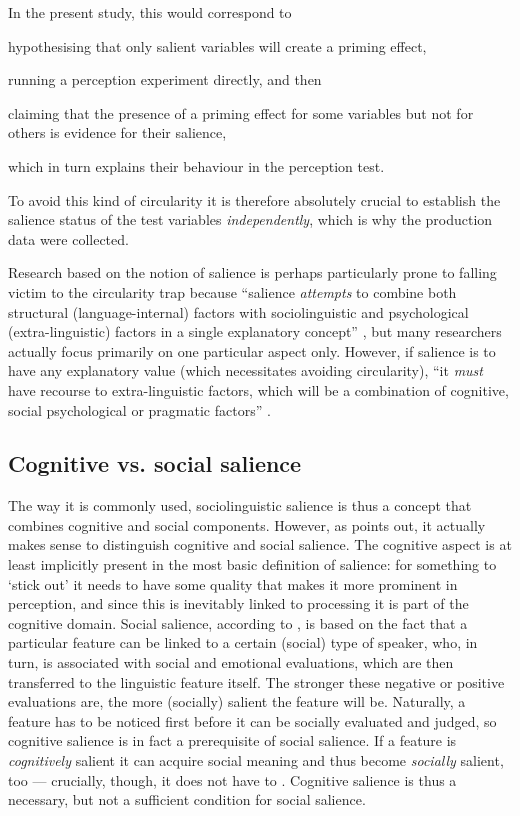 In the present study, this would correspond to
\begin{inparaenum}[(1)]
	\item hypothesising that only salient variables will create a priming effect,
	\item running a perception experiment directly, and then
	\item claiming that the presence of a priming effect for some variables but not for others is evidence for their salience,
	\item which in turn explains their behaviour in the perception test.
\end{inparaenum}
To avoid this kind of circularity it is therefore absolutely crucial to establish the salience status of the test variables \emph{independently}, which is why the production data were collected.

Research based on the notion of salience is perhaps particularly prone to falling victim to the circularity trap because ``salience \emph{attempts} to combine both structural (language-internal) factors with sociolinguistic and psychological (extra-linguistic) factors in a single explanatory concept'' \parencite[83, my emphasis]{kerswillwilliams2002}, but many researchers actually focus primarily on one particular aspect only.
However, if salience is to have any explanatory value (which necessitates avoiding circularity), ``it \emph{must} have recourse to extra-linguistic factors, which will be a combination of cognitive, social psychological or pragmatic factors'' \parencite[83, my emphasis]{kerswillwilliams2002}.

		\subsection{Cognitive vs. social salience}
		\label{sec.sal.sal.cog}

The way it is commonly used, sociolinguistic salience is thus a concept that combines cognitive and social components.
However, as \textcite[cf.][11]{racz2013} points out, it actually makes sense to distinguish cognitive and social salience.
The cognitive aspect is at least implicitly present in the most basic definition of salience: for something to `stick out' it needs to have some quality that makes it more prominent in perception, and since this is inevitably linked to processing it is part of the cognitive domain.
Social salience, according to \textcite[cf.][10]{auer2014}, is based on the fact that a particular feature can be linked to a certain (social) type of speaker, who, in turn, is associated with social and emotional evaluations, which are then transferred to the linguistic feature itself.
The stronger these negative or positive evaluations are, the more (socially) salient the feature will be.
Naturally, a feature has to be noticed first before it can be socially evaluated and judged, so cognitive salience is in fact a prerequisite of social salience.
If a feature is \emph{cognitively} salient it can acquire social meaning and thus become \emph{socially} salient, too --- crucially, though, it does not have to \parencite[cf.][11]{racz2013}.
Cognitive salience is thus a necessary, but not a sufficient condition for social salience.


